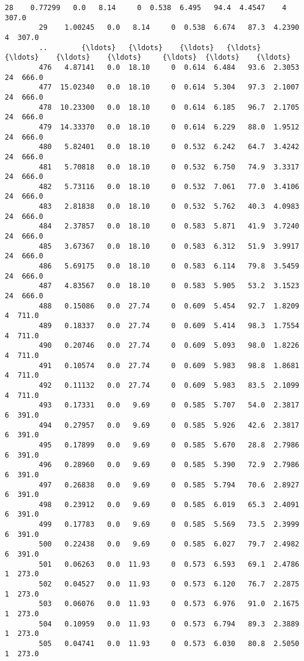 \documentclass[11pt]{article}
\begin{document}
\begin{Verbatim}[commandchars=\\\{\}]
        28    0.77299   0.0   8.14     0  0.538  6.495   94.4  4.4547    4  307.0   
        29    1.00245   0.0   8.14     0  0.538  6.674   87.3  4.2390    4  307.0   
        ..        {\ldots}   {\ldots}    {\ldots}   {\ldots}    {\ldots}    {\ldots}    {\ldots}     {\ldots}  {\ldots}    {\ldots}   
        476   4.87141   0.0  18.10     0  0.614  6.484   93.6  2.3053   24  666.0   
        477  15.02340   0.0  18.10     0  0.614  5.304   97.3  2.1007   24  666.0   
        478  10.23300   0.0  18.10     0  0.614  6.185   96.7  2.1705   24  666.0   
        479  14.33370   0.0  18.10     0  0.614  6.229   88.0  1.9512   24  666.0   
        480   5.82401   0.0  18.10     0  0.532  6.242   64.7  3.4242   24  666.0   
        481   5.70818   0.0  18.10     0  0.532  6.750   74.9  3.3317   24  666.0   
        482   5.73116   0.0  18.10     0  0.532  7.061   77.0  3.4106   24  666.0   
        483   2.81838   0.0  18.10     0  0.532  5.762   40.3  4.0983   24  666.0   
        484   2.37857   0.0  18.10     0  0.583  5.871   41.9  3.7240   24  666.0   
        485   3.67367   0.0  18.10     0  0.583  6.312   51.9  3.9917   24  666.0   
        486   5.69175   0.0  18.10     0  0.583  6.114   79.8  3.5459   24  666.0   
        487   4.83567   0.0  18.10     0  0.583  5.905   53.2  3.1523   24  666.0   
        488   0.15086   0.0  27.74     0  0.609  5.454   92.7  1.8209    4  711.0   
        489   0.18337   0.0  27.74     0  0.609  5.414   98.3  1.7554    4  711.0   
        490   0.20746   0.0  27.74     0  0.609  5.093   98.0  1.8226    4  711.0   
        491   0.10574   0.0  27.74     0  0.609  5.983   98.8  1.8681    4  711.0   
        492   0.11132   0.0  27.74     0  0.609  5.983   83.5  2.1099    4  711.0   
        493   0.17331   0.0   9.69     0  0.585  5.707   54.0  2.3817    6  391.0   
        494   0.27957   0.0   9.69     0  0.585  5.926   42.6  2.3817    6  391.0   
        495   0.17899   0.0   9.69     0  0.585  5.670   28.8  2.7986    6  391.0   
        496   0.28960   0.0   9.69     0  0.585  5.390   72.9  2.7986    6  391.0   
        497   0.26838   0.0   9.69     0  0.585  5.794   70.6  2.8927    6  391.0   
        498   0.23912   0.0   9.69     0  0.585  6.019   65.3  2.4091    6  391.0   
        499   0.17783   0.0   9.69     0  0.585  5.569   73.5  2.3999    6  391.0   
        500   0.22438   0.0   9.69     0  0.585  6.027   79.7  2.4982    6  391.0   
        501   0.06263   0.0  11.93     0  0.573  6.593   69.1  2.4786    1  273.0   
        502   0.04527   0.0  11.93     0  0.573  6.120   76.7  2.2875    1  273.0   
        503   0.06076   0.0  11.93     0  0.573  6.976   91.0  2.1675    1  273.0   
        504   0.10959   0.0  11.93     0  0.573  6.794   89.3  2.3889    1  273.0   
        505   0.04741   0.0  11.93     0  0.573  6.030   80.8  2.5050    1  273.0   
        

\end{Verbatim}
\end{document}
